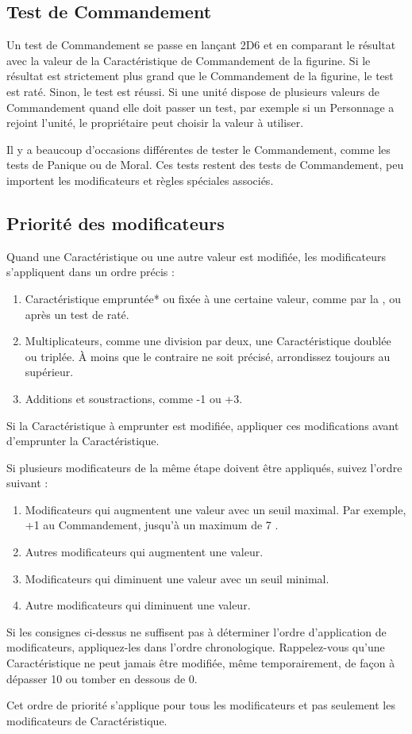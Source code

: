 \subsection{Test de Commandement}

Un test de Commandement se passe en lançant 2D6 et en comparant le résultat avec la valeur de la Caractéristique de Commandement de la figurine. Si le résultat est strictement plus grand que le Commandement de la figurine, le test est raté. Sinon, le test est réussi. Si une unité dispose de plusieurs valeurs de Commandement quand elle doit passer un test, par exemple si un Personnage a rejoint l'unité, le propriétaire peut choisir la valeur à utiliser.

Il y a beaucoup d'occasions différentes de tester le Commandement, comme les tests de Panique ou de Moral. Ces tests restent des tests de Commandement, peu importent les modificateurs et règles spéciales associés.

\subsection{Priorité des modificateurs}
\label{priority_of_modifiers}

Quand une Caractéristique ou une autre valeur est modifiée, les modificateurs s'appliquent dans un ordre précis :
\begin{enumerate}
\item Caractéristique empruntée* ou fixée à une certaine valeur, comme par la \inspiringpresence{}, ou après un test de \fear{} raté.
\item Multiplicateurs, comme une division par deux, une Caractéristique doublée ou triplée. À moins que le contraire ne soit précisé, arrondissez toujours au supérieur.
\item Additions et soustractions, comme -1 ou +3.
\end{enumerate}
\noindent * Si la Caractéristique à emprunter est modifiée, appliquer ces modifications avant d'emprunter la Caractéristique. 

Si plusieurs modificateurs de la même étape doivent être appliqués, suivez l'ordre suivant :
\begin{enumerate}
\item Modificateurs qui augmentent une valeur avec un seuil maximal. Par exemple, \og +1 au Commandement, jusqu'à un maximum de 7 \fg{}.
\item Autres modificateurs qui augmentent une valeur.
\item Modificateurs qui diminuent une valeur avec un seuil minimal.
\item Autre modificateurs qui diminuent une valeur.
\end{enumerate}

Si les consignes ci-dessus ne suffisent pas à déterminer l'ordre d'application de modificateurs, appliquez-les dans l'ordre chronologique. Rappelez-vous qu'une Caractéristique ne peut jamais être modifiée, même temporairement, de façon à dépasser 10 ou tomber en dessous de 0.

Cet ordre de priorité s'applique pour tous les modificateurs et pas seulement les modificateurs de Caractéristique.


